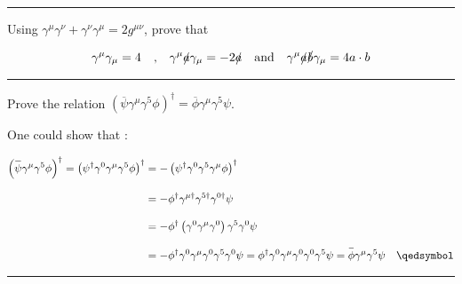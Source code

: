 \noindent\rule{7in}{1.5pt}


\begin{problem}{6.8}
    Using $\gamma^\mu\gamma^\nu + \gamma^\nu\gamma^\mu = 2g^{\mu\nu}$, prove that 

    \begin{align*}
        \gamma^\mu\gamma_\mu =4 \quad \text{,} \quad \gamma^\mu \slashed{a}  \gamma_\mu = - 2 \slashed{a} \quad \text{and} \quad \gamma^\mu \slashed{a} \slashed{b} \gamma_\mu = 4 a\cdot b \\
    \end{align*}
\end{problem}
\begin{solution}

\end{solution}

\noindent\rule{7in}{1.5pt}


\begin{problem}{6.9}
Prove the relation $ \left(\overbar{\psi}\gamma^\mu\gamma^5\phi\right)^\dagger=\overbar{\phi}\gamma^\mu\gamma^5\psi$.
\end{problem}
\begin{solution}
One could show that :

\begin{align*}
    \left(\overbar{\psi}\gamma^\mu\gamma^5\phi\right)^\dagger = \left( \psi^\dagger \gamma^0 \gamma^\mu \gamma^5 \phi \right)^\dagger &= -  \left( \psi^\dagger \gamma^0  \gamma^5 \gamma^\mu \phi \right)^\dagger \\[0.12in]
    &= - \phi^\dagger \gamma^{\mu\dagger} \gamma^{5\dagger} \gamma^{0\dagger}  \psi \\[0.12in]
    &=  - \phi^\dagger \left(\gamma^0 \gamma^{\mu} \gamma^0\right) \gamma^5 \gamma^0  \psi \\[0.12in]
    &=  - \phi^\dagger \gamma^0    \gamma^\mu \gamma^0  \gamma^5 \gamma^0    \psi  = \phi^\dagger \gamma^0    \gamma^\mu \gamma^0  \gamma^0  \gamma^5   \psi =\overbar{\phi}\gamma^\mu\gamma^5\psi \qed 
\end{align*}
\end{solution}

\noindent\rule{7in}{1.5pt}

